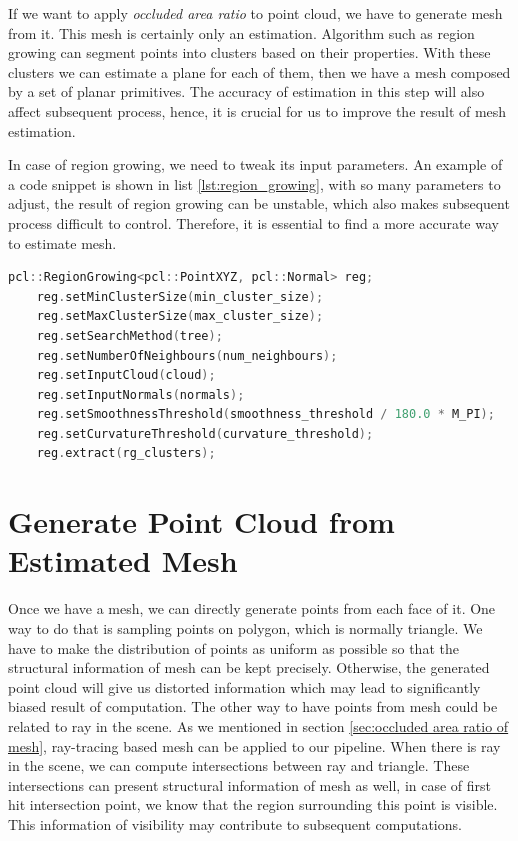 \documentclass[11pt, a4paper,oneside,chapterprefix=false]{scrbook}
\begin{document}
If we want to apply \emph{occluded area ratio} to point cloud, we have to generate mesh from it. This mesh is certainly only an estimation. Algorithm such as region growing can segment points into clusters based on their properties. With these clusters we can estimate a plane for each of them, then we have a mesh composed by a set of planar primitives. The accuracy of estimation in this step will also affect subsequent process, hence, it is crucial for us to improve the result of mesh estimation. 

\vspace{10pt}

In case of region growing, we need to tweak its input parameters. An example of a code snippet is shown in list \ref{lst:region_growing}, with so many parameters to adjust, the result of region growing can be unstable, which also makes subsequent process difficult to control. Therefore, it is essential to find a more accurate way to estimate mesh.   
\begin{lstlisting}[language=C++, caption=region growing, label=lst:region_growing]
    pcl::RegionGrowing<pcl::PointXYZ, pcl::Normal> reg;
    reg.setMinClusterSize(min_cluster_size);
    reg.setMaxClusterSize(max_cluster_size);
    reg.setSearchMethod(tree);
    reg.setNumberOfNeighbours(num_neighbours);
    reg.setInputCloud(cloud);
    reg.setInputNormals(normals);
    reg.setSmoothnessThreshold(smoothness_threshold / 180.0 * M_PI);
    reg.setCurvatureThreshold(curvature_threshold);
    reg.extract(rg_clusters);
\end{lstlisting}

\section{Generate Point Cloud from Estimated Mesh} \label{generate point cloud from estimated mesh}

Once we have a mesh, we can directly generate points from each face of it. One way to do that is sampling points on polygon, which is normally triangle. We have to make the distribution of points as uniform as possible so that the structural information of mesh can be kept precisely. Otherwise, the generated point cloud will give us distorted information which may lead to significantly biased result of computation. The other way to have points from mesh could be related to ray in the scene. As we mentioned in section \ref{sec:occluded area ratio of mesh}, ray-tracing based mesh can be applied to our pipeline. When there is ray in the scene, we can compute intersections between ray and triangle. These intersections can present structural information of mesh as well, in case of first hit intersection point, we know that the region surrounding this point is visible. This information of visibility may contribute to subsequent computations. 
\end{document}
